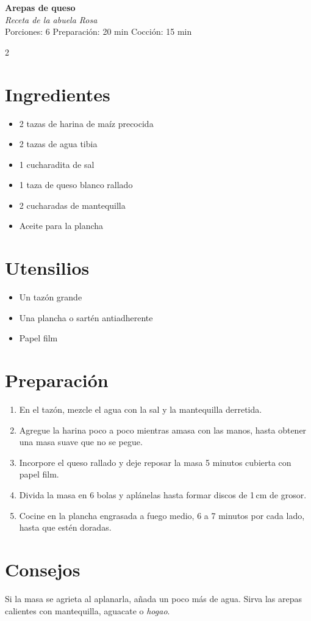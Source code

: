 \documentclass[11pt,a5paper]{article}
\begin{document}
\begin{center}
{\LARGE\bfseries Arepas de queso}\\[4pt]
\textit{Receta de la abuela Rosa}\\[2pt]
Porciones: 6 \quad Preparación: 20 min \quad Cocción: 15 min
\end{center}

\begin{multicols}{2}
\section*{Ingredientes}
\begin{itemize}[leftmargin=*, itemsep=0pt]
  \item 2 tazas de harina de maíz precocida
  \item 2 tazas de agua tibia
  \item 1 cucharadita de sal
  \item 1 taza de queso blanco rallado
  \item 2 cucharadas de mantequilla
  \item Aceite para la plancha
\end{itemize}

\columnbreak

\section*{Utensilios}
\begin{itemize}[leftmargin=*, itemsep=0pt]
  \item Un tazón grande
  \item Una plancha o sartén antiadherente
  \item Papel film
\end{itemize}
\end{multicols}

\section*{Preparación}
\begin{enumerate}[label=\textbf{\arabic*.}, leftmargin=*]
  \item En el tazón, mezcle el agua con la sal y la mantequilla derretida.
  \item Agregue la harina poco a poco mientras amasa con las manos, hasta obtener una
        masa suave que no se pegue.
  \item Incorpore el queso rallado y deje reposar la masa 5 minutos cubierta con papel
        film.
  \item Divida la masa en 6 bolas y aplánelas hasta formar discos de 1\,cm de grosor.
  \item Cocine en la plancha engrasada a fuego medio, 6 a 7 minutos por cada lado, hasta
        que estén doradas.
\end{enumerate}

\section*{Consejos}
Si la masa se agrieta al aplanarla, añada un poco más de agua. Sirva las arepas calientes
con mantequilla, aguacate o \emph{hogao}.
\end{document}
